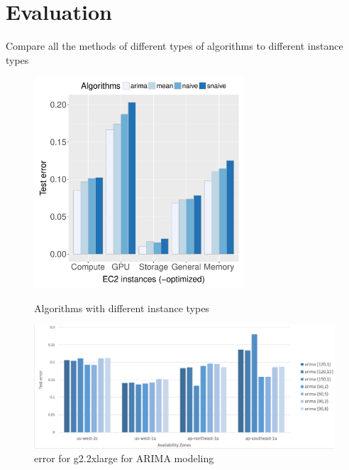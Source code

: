 \documentclass[graybox]{svmult}
\begin{document}
\section{Evaluation}
Compare all the methods of different types of algorithms to different instance types
\begin{figure}
\centering\includegraphics[width=0.7\textwidth]{figures/algorithm-compare-different-instance-type.pdf}\caption{Algorithms with different instance types\label{fig:algo-diff-inst}}
\centering\includegraphics[width=1.2\textwidth]{figures/g2-4M-L.png}\caption{ error for g2.2xlarge for ARIMA modeling\label{fig:algo-diff-inst}}
\end{figure}
\end{document}
